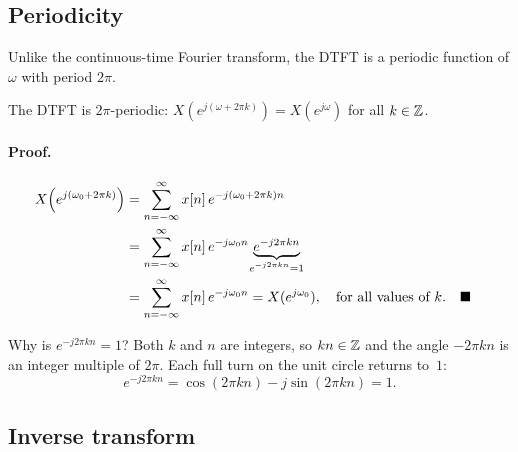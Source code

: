 \documentclass[handout_subfiles_root.tex]{subfiles}
\begin{document}

\subsection{Periodicity}

Unlike the continuous-time Fourier transform, the DTFT is a periodic function of $\omega$ with period $2\pi$.\footnotemark{}

\begin{factbox}[title={Property}]
The DTFT is $2\pi$-periodic: $X(e^{j(\omega+2\pi k)}) = X(e^{j\omega})$ for all $k\in\mathbb{Z}$.
\end{factbox}

\paragraph{Proof.}
\begin{align*}
X\!\left(e^{j(\omega_0+2\pi k)}\right) &= \sum_{n=-\infty}^{\infty} x[n]\,e^{-j(\omega_0+2\pi k)n} \\
&= \sum_{n=-\infty}^{\infty} x[n]\,e^{-j\omega_0 n}\,\underbrace{e^{-j2\pi k n}}_{\HandoutUnderbraceLabel{e^{-j2\pi kn}=1}} \\
&= \sum_{n=-\infty}^{\infty} x[n]\,e^{-j\omega_0 n} = X(e^{j\omega_0}), \quad \text{for all values of $k$.} && \HandoutQEDalign
\end{align*}

\begin{notebox}[title=\HandoutNoteAddendumTitle]
Why is $e^{-j2\pi kn}=1$? Both $k$ and $n$ are integers, so $kn\in\mathbb{Z}$ and the angle $-2\pi kn$ is an integer multiple of $2\pi$.
Each full turn on the unit circle returns to~$1$:
\begin{equation*}
  e^{-j2\pi kn}=\cos(2\pi kn)-j\sin(2\pi kn)=1.
\end{equation*}
\end{notebox}

\subsection{Inverse transform}
\end{document}
